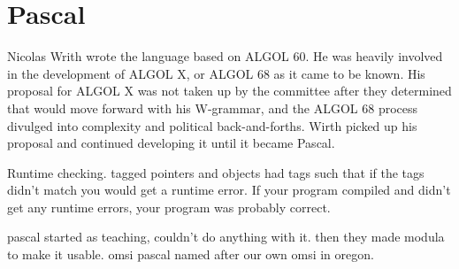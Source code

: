 \section{Pascal}

Nicolas Writh wrote the language based on ALGOL 60.
He was heavily involved in the development of ALGOL X, or ALGOL 68 as it came to be known.
His proposal for ALGOL X was not taken up by the committee after they determined
that  would move forward with his W-grammar, and the
ALGOL 68 process divulged into complexity and political back-and-forths.
Wirth picked up his proposal and continued developing it until it became Pascal.


Runtime checking. tagged pointers and objects had tags such that if the tags didn't
match you would get a runtime error. If your program compiled and didn't get any
runtime errors, your program was probably correct.

pascal started as teaching, couldn't do anything with it.
then they made modula to make it usable.
omsi pascal named after our own omsi in oregon.
